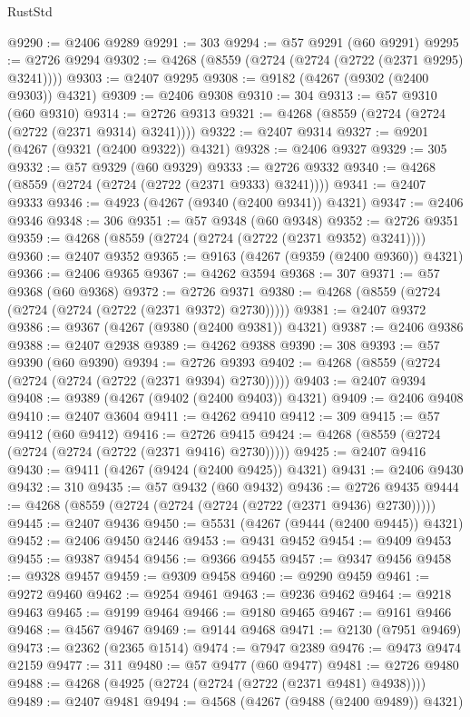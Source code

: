\begin{lexlean}{RustStd}
\begin{coremodule}
@9290 := @2406 @9289
@9291 := 303
@9294 := @57 @9291 (@60 @9291)
@9295 := @2726 @9294
@9302 := @4268 (@8559 (@2724 (@2724 (@2722 (@2371 @9295) @3241))))
@9303 := @2407 @9295
@9308 := @9182 (@4267 (@9302 (@2400 @9303)) @4321)
@9309 := @2406 @9308
@9310 := 304
@9313 := @57 @9310 (@60 @9310)
@9314 := @2726 @9313
@9321 := @4268 (@8559 (@2724 (@2724 (@2722 (@2371 @9314) @3241))))
@9322 := @2407 @9314
@9327 := @9201 (@4267 (@9321 (@2400 @9322)) @4321)
@9328 := @2406 @9327
@9329 := 305
@9332 := @57 @9329 (@60 @9329)
@9333 := @2726 @9332
@9340 := @4268 (@8559 (@2724 (@2724 (@2722 (@2371 @9333) @3241))))
@9341 := @2407 @9333
@9346 := @4923 (@4267 (@9340 (@2400 @9341)) @4321)
@9347 := @2406 @9346
@9348 := 306
@9351 := @57 @9348 (@60 @9348)
@9352 := @2726 @9351
@9359 := @4268 (@8559 (@2724 (@2724 (@2722 (@2371 @9352) @3241))))
@9360 := @2407 @9352
@9365 := @9163 (@4267 (@9359 (@2400 @9360)) @4321)
@9366 := @2406 @9365
@9367 := @4262 @3594
@9368 := 307
@9371 := @57 @9368 (@60 @9368)
@9372 := @2726 @9371
@9380 := @4268 (@8559 (@2724 (@2724 (@2724 (@2722 (@2371 @9372) @2730)))))
@9381 := @2407 @9372
@9386 := @9367 (@4267 (@9380 (@2400 @9381)) @4321)
@9387 := @2406 @9386
@9388 := @2407 @2938
@9389 := @4262 @9388
@9390 := 308
@9393 := @57 @9390 (@60 @9390)
@9394 := @2726 @9393
@9402 := @4268 (@8559 (@2724 (@2724 (@2724 (@2722 (@2371 @9394) @2730)))))
@9403 := @2407 @9394
@9408 := @9389 (@4267 (@9402 (@2400 @9403)) @4321)
@9409 := @2406 @9408
@9410 := @2407 @3604
@9411 := @4262 @9410
@9412 := 309
@9415 := @57 @9412 (@60 @9412)
@9416 := @2726 @9415
@9424 := @4268 (@8559 (@2724 (@2724 (@2724 (@2722 (@2371 @9416) @2730)))))
@9425 := @2407 @9416
@9430 := @9411 (@4267 (@9424 (@2400 @9425)) @4321)
@9431 := @2406 @9430
@9432 := 310
@9435 := @57 @9432 (@60 @9432)
@9436 := @2726 @9435
@9444 := @4268 (@8559 (@2724 (@2724 (@2724 (@2722 (@2371 @9436) @2730)))))
@9445 := @2407 @9436
@9450 := @5531 (@4267 (@9444 (@2400 @9445)) @4321)
@9452 := @2406 @9450 @2446
@9453 := @9431 @9452
@9454 := @9409 @9453
@9455 := @9387 @9454
@9456 := @9366 @9455
@9457 := @9347 @9456
@9458 := @9328 @9457
@9459 := @9309 @9458
@9460 := @9290 @9459
@9461 := @9272 @9460
@9462 := @9254 @9461
@9463 := @9236 @9462
@9464 := @9218 @9463
@9465 := @9199 @9464
@9466 := @9180 @9465
@9467 := @9161 @9466
@9468 := @4567 @9467
@9469 := @9144 @9468
@9471 := @2130 (@7951 @9469)
@9473 := @2362 (@2365 @1514)
@9474 := @7947 @2389
@9476 := @9473 @9474 @2159
@9477 := 311
@9480 := @57 @9477 (@60 @9477)
@9481 := @2726 @9480
@9488 := @4268 (@4925 (@2724 (@2724 (@2722 (@2371 @9481) @4938))))
@9489 := @2407 @9481
@9494 := @4568 (@4267 (@9488 (@2400 @9489)) @4321)

\end{coremodule}
\end{lexlean}
